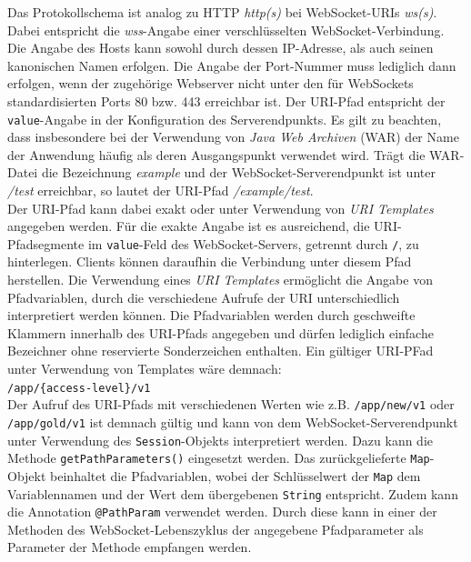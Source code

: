 \documentclass[11pt,a4paper,titlepage]{scrartcl}
\numberwithin{equation}{section}
\begin{document}
\noindent Das Protokollschema ist analog zu HTTP \textit{http(s)} bei WebSocket-URIs \textit{ws(s)}. Dabei entspricht die \textit{wss}-Angabe einer verschlüsselten WebSocket-Verbindung. Die Angabe des Hosts kann sowohl durch dessen IP-Adresse, als auch seinen kanonischen Namen erfolgen. Die Angabe der Port-Nummer muss lediglich dann erfolgen, wenn der zugehörige Webserver nicht unter den für WebSockets standardisierten Ports 80 bzw. 443 erreichbar ist. Der URI-Pfad entspricht der \texttt{value}-Angabe in der Konfiguration des Serverendpunkts. Es gilt zu beachten, dass insbesondere bei der Verwendung von \textit{Java Web Archiven} (WAR) der Name der Anwendung häufig als deren Ausgangspunkt verwendet wird. Trägt die WAR-Datei die Bezeichnung \textit{example} und der WebSocket-Serverendpunkt ist unter \textit{/test} erreichbar, so lautet der URI-Pfad \textit{/example/test}. \\

\noindent Der URI-Pfad kann dabei exakt oder unter Verwendung von \textit{URI Templates} angegeben werden. Für die exakte Angabe ist es ausreichend, die URI-Pfadsegmente im \texttt{value}-Feld des WebSocket-Servers, getrennt durch \texttt{/}, zu hinterlegen. Clients können daraufhin die Verbindung unter diesem Pfad herstellen. Die Verwendung eines \textit{URI Templates} ermöglicht die Angabe von Pfadvariablen, durch die verschiedene Aufrufe der URI unterschiedlich interpretiert werden können. Die Pfadvariablen werden durch geschweifte Klammern innerhalb des URI-Pfads angegeben und dürfen lediglich einfache Bezeichner ohne reservierte Sonderzeichen enthalten. Ein gültiger URI-PFad unter Verwendung von Templates wäre demnach: \\

\noindent\texttt{/app/\{access-level\}/v1}\\

\noindent Der Aufruf des URI-Pfads mit verschiedenen Werten wie z.B. \texttt{/app/new/v1} oder \texttt{/app/gold/v1} ist demnach gültig und kann von dem WebSocket-Serverendpunkt unter Verwendung des \texttt{Session}-Objekts interpretiert werden. Dazu kann die Methode \texttt{getPathParameters()} eingesetzt werden. Das zurückgelieferte \texttt{Map}-Objekt beinhaltet die Pfadvariablen, wobei der Schlüsselwert der \texttt{Map} dem Variablennamen und der Wert dem übergebenen \texttt{String} entspricht. Zudem kann die Annotation \texttt{@PathParam} verwendet werden. Durch diese kann in einer der Methoden des WebSocket-Lebenszyklus der angegebene Pfadparameter als Parameter der Methode empfangen werden.\medskip
\end{document}
